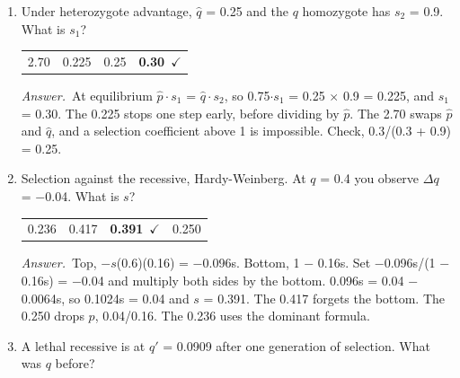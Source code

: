 \documentclass[11pt]{article}
\newcommand{\keyans}[1]{\par\medskip\noindent\textit{Answer.}\ #1\par\medskip}
\begin{document}
\vspace{0.6em}
\begin{enumerate}[label=\textbf{\arabic*.}, leftmargin=2em, itemsep=1.4em]
\item Under heterozygote advantage, \(\hat{q}\) = 0.25 and the \(q\) homozygote has \(s_2\) = 0.9. What is \(s_1\)?
\nopagebreak\par{}
\par\smallskip\noindent\begin{tabularx}{\linewidth}{@{}YYYY@{}}
2.70 & 0.225 & 0.25 & \textbf{0.30}\ \(\checkmark\) \\
\end{tabularx}
\keyans{At equilibrium \(\hat{p} \cdot s_1\) = \(\hat{q} \cdot s_2\), so 0.75\(\cdot s_1\) = 0.25 \(\times\) 0.9 = 0.225, and \(s_1\) = 0.30. The 0.225 stops one step early, before dividing by \(\hat{p}\). The 2.70 swaps \(\hat{p}\) and \(\hat{q}\), and a selection coefficient above 1 is impossible. Check, 0.3/(0.3 + 0.9) = 0.25.}
\item Selection against the recessive, Hardy-Weinberg. At \(q\) = 0.4 you observe \(\Delta q\) = \(-\)0.04. What is \(s\)?
\nopagebreak\par{}
\par\smallskip\noindent\begin{tabularx}{\linewidth}{@{}YYYY@{}}
0.236 & 0.417 & \textbf{0.391}\ \(\checkmark\) & 0.250 \\
\end{tabularx}
\keyans{Top, \(- s\)(0.6)(0.16) = \(-\)0.096s. Bottom, 1 \(-\) 0.16s. Set \(-\)0.096s/(1 \(-\) 0.16s) = \(-\)0.04 and multiply both sides by the bottom. 0.096s = 0.04 \(-\) 0.0064s, so 0.1024s = 0.04 and \(s\) = 0.391. The 0.417 forgets the bottom. The 0.250 drops \(p\), 0.04/0.16. The 0.236 uses the dominant formula.}
\item A lethal recessive is at \(q'\) = 0.0909 after one generation of selection. What was \(q\) before?
\nopagebreak\par{}
\par\smallskip\noindent\begin{tabularx}{\linewidth}{@{}YYYY@{}}

\end{tabularx}
\end{enumerate}
\end{document}
